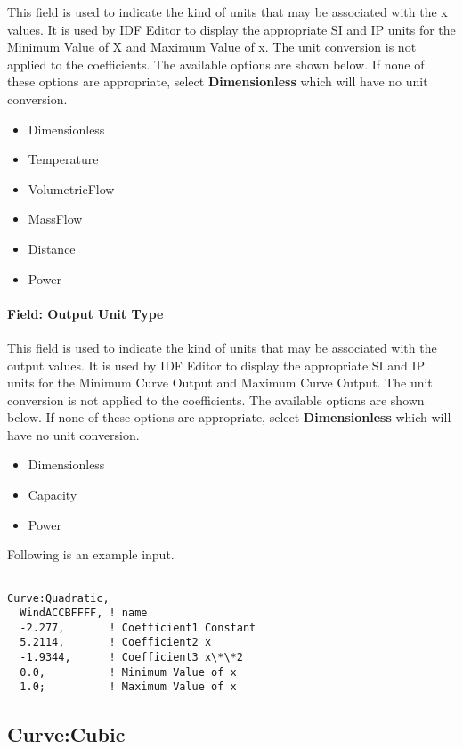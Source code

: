 This field is used to indicate the kind of units that may be associated with the x values. It is used by IDF Editor to display the appropriate SI and IP units for the Minimum Value of X and Maximum Value of x. The unit conversion is not applied to the coefficients. The available options are shown below. If none of these options are appropriate, select \textbf{Dimensionless} which will have no unit conversion.

\begin{itemize}
\item
  Dimensionless
\item
  Temperature
\item
  VolumetricFlow
\item
  MassFlow
\item
  Distance
\item
  Power
\end{itemize}

\paragraph{Field: Output Unit Type}\label{field-output-unit-type-1}

This field is used to indicate the kind of units that may be associated with the output values. It is used by IDF Editor to display the appropriate SI and IP units for the Minimum Curve Output and Maximum Curve Output. The unit conversion is not applied to the coefficients. The available options are shown below. If none of these options are appropriate, select \textbf{Dimensionless} which will have no unit conversion.

\begin{itemize}
\item
  Dimensionless
\item
  Capacity
\item
  Power
\end{itemize}

Following is an example input.

\begin{lstlisting}

Curve:Quadratic,
  WindACCBFFFF, ! name
  -2.277,       ! Coefficient1 Constant
  5.2114,       ! Coefficient2 x
  -1.9344,      ! Coefficient3 x\*\*2
  0.0,          ! Minimum Value of x
  1.0;          ! Maximum Value of x
\end{lstlisting}

\subsection{Curve:Cubic}\label{curvecubic}

